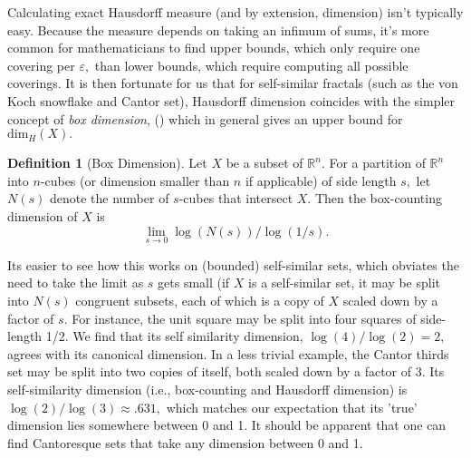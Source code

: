 \documentclass[12pt, letterpaper, oneside]{book}
\renewcommand{\ge}{\ensuremath{\varepsilon}}
\newcommand{\R}{\mathbb{R}}
\theoremstyle{plain}
\theoremstyle{definition}
\newtheorem{definition}{Definition}
\theoremstyle{remark}
\begin{document}
Calculating exact Hausdorff measure (and by extension, dimension) isn't typically easy. Because the measure depends on taking an infimum of sums, it's more common for mathematicians to find upper bounds, which only require one covering per $\ge,$ than lower bounds, which require computing all possible coverings. It is then fortunate for us that for self-similar fractals (such as the von Koch snowflake and Cantor set), Hausdorff dimension coincides with the simpler concept of \textit{box dimension}, (\cite{Sch07}) which in general gives an upper bound for $\mbox{dim}_H(X).$

\begin{definition}[Box Dimension]
Let $X$ be a subset of $\R^n.$ For a partition of $\R^n$ into $n$-cubes (or dimension smaller than $n$ if applicable) of side length $s,$ let $N(s)$ denote the number of $s$-cubes that intersect $X.$ Then the box-counting dimension of $X$ is
\[
\lim \limits_{s \to 0} \log (N(s))/ \log(1/s). 
\]
\end{definition}

Its easier to see how this works on (bounded) self-similar sets, which obviates the need to take the limit as $s$ gets small (if $X$ is a self-similar set, it may be split into $N(s)$ congruent subsets, each of which is a copy of $X$ scaled down by a factor of $s.$ For instance, the unit square may be split into four squares of side-length 1/2. We find that its self similarity dimension, $\log(4) / \log(2) = 2,$ agrees with its canonical dimension. In a less trivial example, the Cantor thirds set may be split into two copies of itself, both scaled down by a factor of 3. Its self-similarity dimension (i.e., box-counting and Hausdorff dimension) is $\log(2) / \log(3) \approx  .631,$ which matches our expectation that its 'true' dimension lies somewhere between 0 and 1. It should be apparent that one can find Cantoresque sets that take any dimension between 0 and 1.
\end{document}
